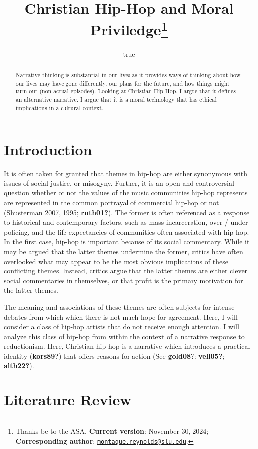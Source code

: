 \documentclass[
]{article}
\title{Christian Hip-Hop and Moral Priviledge\thanks{Thanks be to the
ASA. \textbf{Current version}: November 30, 2024; \textbf{Corresponding
author}:
\href{mailto:montaque.reynolds@slu.edu}{\nolinkurl{montaque.reynolds@slu.edu}}.}}
\author{true}
\date{}
\begin{document}
\maketitle
\begin{abstract}
Narrative thinking is substantial in our lives as it provides ways of
thinking about how our lives may have gone differently, our plans for
the future, and how things might turn out (non-actual episodes). Looking
at Christian Hip-Hop, I argue that it defines an alternative narrative.
I argue that it is a moral technology that has ethical implications in a
cultural context.
\end{abstract}

\hypertarget{introduction}{%
\section{Introduction}\label{introduction}}

It is often taken for granted that themes in hip-hop are either
synonymous with issues of social justice, or misogyny. Further, it is an
open and controversial question whether or not the values of the music
communities hip-hop represents are represented in the common portrayal
of commercial hip-hop or not (Shusterman 2007, 1995; \textbf{ruth01?}).
The former is often referenced as a response to historical and
contemporary factors, such as mass incarceration, over / under policing,
and the life expectancies of communities often associated with hip-hop.
In the first case, hip-hop is important because of its social
commentary. While it may be argued that the latter themes undermine the
former, critics have often overlooked what may appear to be the most
obvious implications of these conflicting themes. Instead, critics argue
that the latter themes are either clever social commentaries in
themselves, or that profit is the primary motivation for the latter
themes.

The meaning and associations of these themes are often subjects for
intense debates from which which there is not much hope for agreement.
Here, I will consider a class of hip-hop artists that do not receive
enough attention. I will analyze this class of hip-hop from within the
context of a narrative response to reductionism. Here, Christian hip-hop
is a narrative which introduces a practical identity (\textbf{kors89?})
that offers reasons for action (See \textbf{gold08?}; \textbf{vell05?};
\textbf{alth22?}).

\hypertarget{literature-review}{%
\section{Literature Review}\label{literature-review}}
\end{document}
